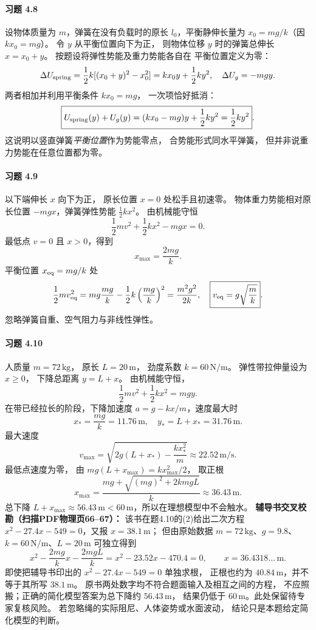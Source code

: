 \paragraph{习题 4.8}
设物体质量为 \(m\)，弹簧在没有负载时的原长
\(l_0\)，平衡静伸长量为
\(x_0=mg/k\)（因 \(kx_0=mg\)）。
令 \(y\) 从平衡位置向下为正，
则物体位移 \(y\) 时的弹簧总伸长
\(x=x_0+y\)。
按题设将弹性势能及重力势能各自在
平衡位置定义为零：
\[
 \Delta U_{\rm spring}
 =\frac12k[(x_0+y)^2-x_0^2]
 =kx_0y+\frac12ky^2,
\quad
 \Delta U_g=-mgy.
\]
两者相加并利用平衡条件 \(kx_0=mg\)，
一次项恰好抵消：
\[
 \boxed{U_{\rm spring}(y)+U_g(y)
 =(kx_0-mg)y+\frac12ky^2
 =\frac12ky^2}.
\]
这说明以竖直弹簧\emph{平衡位置}作为势能零点，
合势能形式同水平弹簧，
但并非说重力势能在任意位置都为零。

\paragraph{习题 4.9}
以下端伸长 \(x\) 向下为正，
原长位置 \(x=0\) 处松手且初速零。
物体重力势能相对原长位置
\(-mgx\)，弹簧弹性势能
\(\frac12kx^2\)。
由机械能守恒
\[
 \frac12mv^2+\frac12kx^2-mgx=0.
\]
最低点 \(v=0\) 且 \(x>0\)，得到
\[
 \boxed{x_{\max}=\frac{2mg}{k}}.
\]
平衡位置 \(x_{\rm eq}=mg/k\) 处
\[
 \frac12mv_{\rm eq}^2
 =mg\frac{mg}k-\frac12k\left(\frac{mg}k\right)^2
 =\frac{m^2g^2}{2k},
\quad
 \boxed{v_{\rm eq}=g\sqrt{\frac m k}}.
\]
忽略弹簧自重、空气阻力与非线性弹性。

\paragraph{习题 4.10}
人质量 \(m=72\,\mathrm{kg}\)，
原长 \(L=20\,\mathrm m\)，
劲度系数 \(k=60\,\mathrm{N/m}\)。
弹性带拉伸量设为 \(x\ge0\)，
下降总距离 \(y=L+x\)。
由机械能守恒，
\[
 \frac12mv^2+\frac12kx^2=mgy.
\]
在带已经拉长的阶段，下降加速度
\(a=g-kx/m\)，速度最大时
\[
 x_*=\frac{mg}k=11.76\,\mathrm m,
\quad
 \boxed{y_*=L+x_*=31.76\,\mathrm m}.
\]
最大速度
\[
 \boxed{v_{\max}=
 \sqrt{2g(L+x_*)-\frac{kx_*^2}{m}}
 \approx22.52\,\mathrm{m/s}}.
\]
最低点速度为零，
由 \(mg(L+x_{\max})=kx_{\max}^2/2\)，
取正根
\[
 \boxed{x_{\max}=
 \frac{mg+\sqrt{(mg)^2+2kmgL}}k
 \approx36.43\,\mathrm m}.
\]
总下降 \(L+x_{\max}\approx56.43\,\mathrm m
 <60\,\mathrm m\)，所以在理想模型中不会触水。
\textbf{辅导书交叉校勘（扫描PDF物理页66--67）：}
该书在题4.10的(2)给出二次方程
\(x^2-27.4x-549=0\)，又报 \(x=38.1\,\mathrm m\)；
但由原始数据 \(m=72\,\mathrm{kg}\)、\(g=9.8\)、
\(k=60\,\mathrm{N/m}\)、\(L=20\,\mathrm m\) 可独立得到
\[
 x^2-\frac{2mg}{k}x-\frac{2mgL}{k}
 =x^2-23.52x-470.4=0,
 \qquad x=36.4318\ldots\,\mathrm m.
\]
即使把辅导书印出的 \(x^2-27.4x-549=0\) 单独求根，
正根也约为 \(40.84\,\mathrm m\)，并不等于其所写 \(38.1\,\mathrm m\)。
原书两处数字均不符合题面输入及相互之间的方程，
不应照搬；正确的简化模型答案为总下降约 \(56.43\,\mathrm m\)，
结果仍低于 \(60\,\mathrm m\)。此处保留待专家复核风险。
若忽略绳的实际阻尼、人体姿势或水面波动，
结论只是本题给定简化模型的判断。


